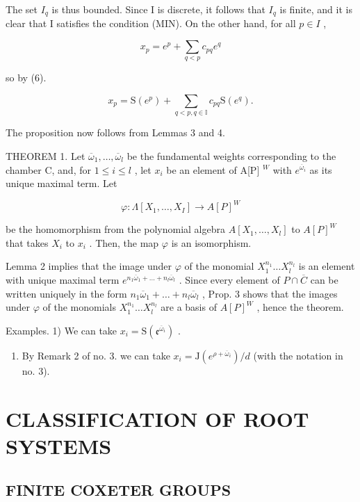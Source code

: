 The set \(I_{q}\) is thus bounded. Since I is discrete, it follows that \(I_{q}\) is finite, and it is clear that I satisfies the condition (MIN). On the other hand, for all \(p \in I\) ,

\[
x _ {p} = e ^ {p} + \sum_ {q <   p} c _ {p q} e ^ {q}
\]

so by (6).

\[
x _ {p} = \mathrm{S} (e ^ {p}) + \sum_ {q <   p, q \in \mathbb {I}} c _ {p q} \mathrm{S} (e ^ {q}).
\]

The proposition now follows from Lemmas 3 and 4.

THEOREM 1. Let \(\overline{\omega}_1, \ldots, \overline{\omega}_l\) be the fundamental weights corresponding to the chamber C, and, for \(1 \leqslant i \leqslant l\) , let \(x_i\) be an element of A{[}P{]} \(^W\) with \(e^{\overline{\omega}_i}\) as its unique maximal term. Let

\[
\varphi : \Lambda [ X _ {1}, \dots , X _ {I} ] \rightarrow A [ P ] ^ {W}
\]

be the homomorphism from the polynomial algebra \(A[X_{1},\ldots,X_{l}]\) to \(A[P]^{W}\) that takes \(X_{i}\) to \(x_{i}\) . Then, the map \(\varphi\) is an isomorphism.

Lemma 2 implies that the image under \(\varphi\) of the monomial \(X_{1}^{n_{1}}\ldots X_{l}^{n_{l}}\) is an element with unique maximal term \(e^{n_1\overline{\omega}_1 + \dots +n_l\overline{\omega}_l}\) . Since every element of \(P\cap \overline{C}\) can be written uniquely in the form \(n_1\overline{\omega}_1 + \dots +n_l\overline{\omega}_l\) , Prop. 3 shows that the images under \(\varphi\) of the monomials \(X_{1}^{n_{1}}\ldots X_{l}^{n_{l}}\) are a basis of \(A[P]^W\) , hence the theorem.

Examples. 1) We can take \(x_{i} = \mathrm{S}(\mathfrak{e}^{\overline{\omega}_i})\) .

\begin{enumerate}
\def\labelenumi{\arabic{enumi})}
\setcounter{enumi}{1}
\tightlist
\item
  By Remark 2 of no. 3. we can take \(x_{i} = \mathrm{J}(e^{\rho +\overline{\omega}_i}) / d\) (with the notation in no. 3).
\end{enumerate}

\section{CLASSIFICATION OF ROOT SYSTEMS}

\subsection{FINITE COXETER GROUPS}

